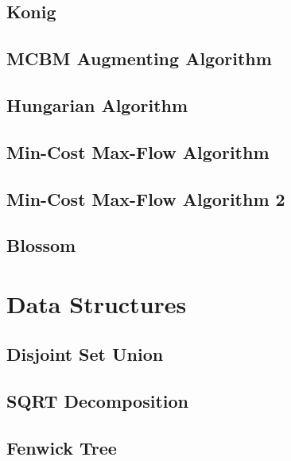 \subsection{Konig}
\raggedbottom
\hrulefill
\subsection{MCBM Augmenting Algorithm}
\raggedbottom
\hrulefill
\subsection{Hungarian Algorithm}
\raggedbottom
\hrulefill
\subsection{Min-Cost Max-Flow Algorithm}
\raggedbottom
\hrulefill
\subsection{Min-Cost Max-Flow Algorithm 2}
\raggedbottom
\hrulefill
\subsection{Blossom}
\raggedbottom
\hrulefill

\section{Data Structures}
\subsection{Disjoint Set Union}
\raggedbottom
\hrulefill
\subsection{SQRT Decomposition}
\raggedbottom
\hrulefill
\subsection{Fenwick Tree}
\raggedbottom
\hrulefill
